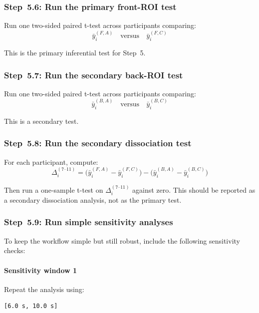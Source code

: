\subsubsection{Step~5.6: Run the primary front-ROI test}
Run one two-sided paired t-test across participants comparing:
\begin{equation}
\bar{y}^{(F,A)}_i \quad \text{versus} \quad \bar{y}^{(F,C)}_i
\end{equation}

This is the primary inferential test for Step~5.

\subsubsection{Step~5.7: Run the secondary back-ROI test}
Run one two-sided paired t-test across participants comparing:
\begin{equation}
\bar{y}^{(B,A)}_i \quad \text{versus} \quad \bar{y}^{(B,C)}_i
\end{equation}

This is a secondary test.

\subsubsection{Step~5.8: Run the secondary dissociation test}
For each participant, compute:
\begin{equation}
\Delta_i^{(7\text{--}11)}
=
\bigl(\bar{y}^{(F,A)}_i - \bar{y}^{(F,C)}_i\bigr)
-
\bigl(\bar{y}^{(B,A)}_i - \bar{y}^{(B,C)}_i\bigr)
\end{equation}

Then run a one-sample t-test on \(\Delta_i^{(7\text{--}11)}\) against zero.
This should be reported as a secondary dissociation analysis, not as the primary test.

\subsubsection{Step~5.9: Run simple sensitivity analyses}
To keep the workflow simple but still robust, include the following sensitivity checks:

\paragraph{Sensitivity window 1}
Repeat the analysis using:
\begin{verbatim}
[6.0 s, 10.0 s]
\end{verbatim}

